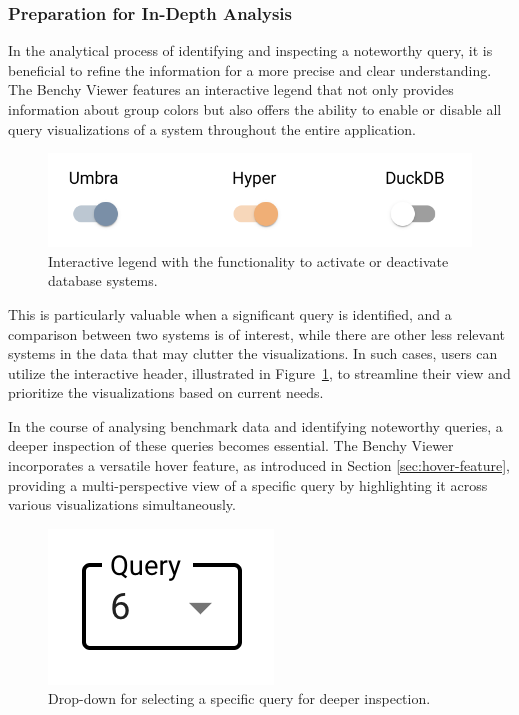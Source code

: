 \subsubsection{Preparation for In-Depth Analysis}

In the analytical process of identifying and inspecting a noteworthy query, it is beneficial to refine the information for a more precise and clear understanding.\\
The Benchy Viewer features an interactive legend that not only provides information about group colors but also offers the ability to enable or disable all query visualizations of a system throughout the entire application.

\begin{figure}[h]
  \centering
  \includegraphics[width=0.4\linewidth]{figures/legend-activate-deactivate.png}
  \caption{Interactive legend with the functionality to activate or deactivate database systems.}
  \label{fig:legend-activate-deactivate}
\end{figure}

This is particularly valuable when a significant query is identified, and a comparison between two systems is of interest, while there are other less relevant systems in the data that may clutter the visualizations. In such cases, users can utilize the interactive header, illustrated in Figure~\ref{fig:legend-activate-deactivate}, to streamline their view and prioritize the visualizations based on current needs.

In the course of analysing benchmark data and identifying noteworthy queries, a deeper inspection of these queries becomes essential. The Benchy Viewer incorporates a versatile hover feature, as introduced in Section \ref{sec:hover-feature}, providing a multi-perspective view of a specific query by highlighting it across various visualizations simultaneously.

\begin{figure}[h]
  \centering
  \includegraphics[width=0.15\linewidth]{figures/select-query.png}
  \caption{Drop-down for selecting a specific query for deeper inspection.}
  \label{fig:select-query}
\end{figure}

